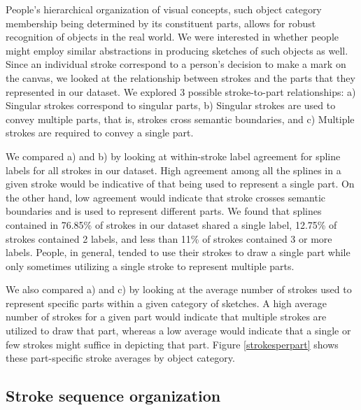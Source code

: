 \documentclass[10pt,letterpaper]{article}
\newcommand{\kushin}[1]{{\color{orange}{[kushin: #1]}}}
\begin{document}
People's hierarchical organization of visual concepts, such object category membership being determined by its constituent parts, allows for robust recognition of objects in the real world. We were interested in whether people might employ similar abstractions in producing sketches of such objects as well. Since an individual stroke correspond to a person's decision to make a mark on the canvas, we looked at the relationship between strokes and the parts that they represented in our dataset. 
We explored 3 possible stroke-to-part relationships:
a) Singular strokes correspond to singular parts, b) Singular strokes are used to convey multiple parts, that is, strokes cross semantic boundaries, and c) Multiple strokes are required to convey a single part. 

We compared a) and b) by looking at within-stroke label agreement for spline labels for all strokes in our dataset. High agreement among all the splines in a given stroke would be indicative of that being used to represent a single part. On the other hand, low agreement would indicate that stroke crosses semantic boundaries and is used to represent different parts. We found that splines contained in 76.85\% of strokes in our dataset shared a single label, 12.75\% of strokes contained 2 labels, and less than 11\% of strokes contained 3 or more labels. People, in general, tended to use their strokes to draw a single part while only sometimes utilizing a single stroke to represent multiple parts.

We also compared a) and c) by looking at the average number of strokes used to represent specific parts within a given category of sketches. A high average number of strokes for a given part would indicate that multiple strokes are utilized to draw that part, whereas a low average would indicate that a single or few strokes might suffice in depicting that part. Figure \ref{strokesperpart} shows these part-specific stroke averages by object category.
\kushin{I feel the above summary, including the figure caption for figure 2 is a little inconclusive. Thoughts on how to remedy this?}



\subsection{Stroke sequence organization}
\end{document}
